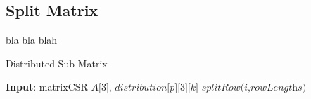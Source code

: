 \subsection{Split Matrix}\label{sec:dspmv-lb-splitmatrix}

bla bla blah \cite{bylina_bylina_stpiczyński_szałkowski_2014}


\begin{algorithm}
	\caption{Distributed Sub Matrix}\label{euclid}
	\begin{algorithmic}[1]
		\State \textbf{Input}: matrixCSR $\textit{A[3]}$, $\textit{distribution[p][3][k]}$
		\medskip
			\EndFor
		\State $\textit{splitRow(i,rowLengths)}$
		\EndIf
		\EndFor

		\EndProcedure
	\end{algorithmic}
\end{algorithm}

